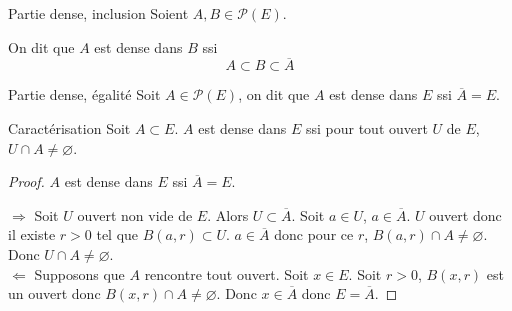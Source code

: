 \begin{definitionnt}{Partie dense, inclusion}{}
    Soient $A, B \in \mathscr P(E)$.

    On dit que $A$ est dense dans $B$ ssi 
    $$A \subset B \subset \overline A$$
\end{definitionnt}

\begin{definitionnt}{Partie dense, égalité}{}
    Soit $A \in \mathscr P(E)$, on dit que $A$ est dense dans $E$ ssi $\overline A = E$.
\end{definitionnt}

\begin{proposition}{Caractérisation}{}
    Soit $A \subset E$. $A$ est  dense dans $E$ ssi pour tout ouvert $U$ de $E$, $U \cap A \not \equal \varnothing$.     
\end{proposition}

\begin{proof}
$A$ est dense dans $E$ ssi $\overline A = E$.

$\Rightarrow$ Soit $U$ ouvert non vide de $E$.
Alors $U \subset \overline A$.
Soit $a \in U$, $a \in \overline A$.
$U$ ouvert donc il existe $r > 0$ tel que $B(a,r) \subset U$.
$a \in \overline A$ donc pour ce $r$, $B(a,r) \cap A \not \equal \varnothing$.
Donc $U \cap A \not \equal \varnothing$. \\

$\Leftarrow$ Supposons que $A$ rencontre tout ouvert.
Soit $x \in E$. Soit $r > 0$, $B(x,r)$ est un ouvert donc $B(x,r) \cap A \not \equal \varnothing$.
Donc $x \in \overline A$ donc $E = \overline A$.
\end{proof}

